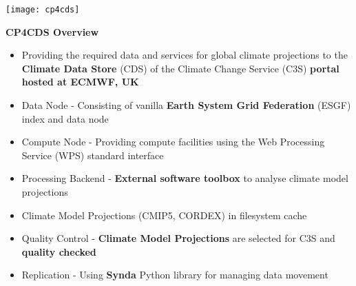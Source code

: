 \documentclass[landscape,a0paper,fontscale=0.4]{baposter} %
\newcommand{\compresslist}{%
\setlength{\itemsep}{1pt}%
\setlength{\parskip}{0pt}%
\setlength{\parsep}{0pt}%
}
\begin{document}
\begin{poster}
{   %



   \begin{minipage}{0.4\textwidth}
     \texttt{[image: cp4cds]}
   \end{minipage}
   \begin{minipage}{0.6\textwidth}
     {\bf CP4CDS Overview}
     \begin{itemize}\compresslist
       \item Providing the required data and services for global climate projections
        to the {\bf Climate Data Store} (CDS) of the
        Climate Change Service (C3S) {\bf portal hosted at ECMWF, UK}
       \item Data Node - Consisting of vanilla {\bf Earth System Grid Federation} (ESGF) index and data node
       \item Compute Node - Providing compute facilities using the Web Processing Service (WPS) standard interface
       \item Processing Backend - {\bf External software toolbox} to analyse climate model projections
       \item Climate Model Projections (CMIP5, CORDEX) in filesystem cache
       \item Quality Control - {\bf Climate Model Projections} are selected for C3S and {\bf quality checked}
       \item Replication - Using {\bf Synda} Python library for managing data movement
     \end{itemize}
  \end{minipage}

}
\end{poster}
\end{document}
